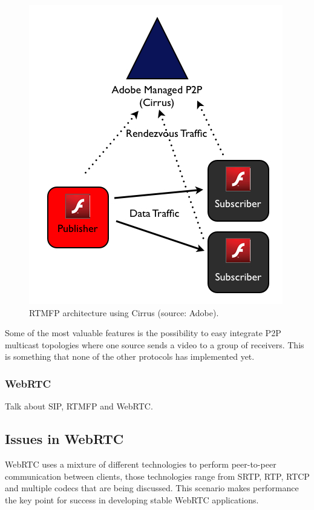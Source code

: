  \begin{figure}[h]
  \centering
    \includegraphics[scale=0.6]{./figures/cirrusAdobe.jpg}
      \caption[RTMFP architecture using Cirrus (source: Adobe)]{RTMFP architecture using Cirrus (source: Adobe).}
	\label{fig:SIParchitecture}
\end{figure}
 
Some of the most valuable features is the possibility to easy integrate P2P multicast topologies where one source sends a video to a group of receivers. This is something that none of the other protocols has implemented yet.

\subsubsection{WebRTC}
Talk about SIP, RTMFP and WebRTC.



\subsection{Issues in WebRTC}

WebRTC uses a mixture of different technologies to perform peer-to-peer communication between clients, those technologies range from SRTP, RTP, RTCP and multiple codecs that are being discussed. This scenario makes performance the key point for success in developing stable WebRTC applications. 

